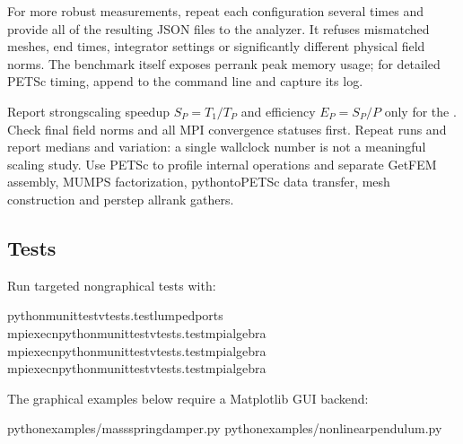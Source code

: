 \documentclass[letterpaper,10pt,english]{sphinxmanual}
\begin{document}
\sphinxAtStartPar
For more robust measurements, repeat each configuration several
times and provide all of the resulting JSON files to the analyzer.
It refuses mismatched meshes, end times, integrator settings or
significantly different physical field norms. The benchmark itself
exposes per\sphinxhyphen{}rank peak memory usage; for detailed PETSc timing,
append  to the command line and capture its log.

\sphinxAtStartPar
Report strong\sphinxhyphen{}scaling speedup
\(S_P=T_1/T_P\) and efficiency \(E_P=S_P/P\)
only for the . Check final field norms and
all MPI convergence statuses first. Repeat runs and report
medians and variation: a single wall\sphinxhyphen{}clock number is not
a meaningful scaling study. Use PETSc  to
profile internal operations and separate GetFEM assembly,
MUMPS factorization, python\sphinxhyphen{}to\sphinxhyphen{}PETSc data transfer,
mesh construction and per\sphinxhyphen{}step all\sphinxhyphen{}rank gathers.


\subsection{Tests}
\label{\detokenize{install:tests}}
\sphinxAtStartPar
Run targeted non\sphinxhyphen{}graphical tests with:

\begin{sphinxVerbatim}[commandchars=\\\{\}]
python\PYGZhy{}munittest\PYGZhy{}vtests.test\PYGZus{}lumped\PYGZus{}ports
mpiexec\PYGZhy{}npython\PYGZhy{}munittest\PYGZhy{}vtests.test\PYGZus{}mpi\PYGZus{}algebra
mpiexec\PYGZhy{}npython\PYGZhy{}munittest\PYGZhy{}vtests.test\PYGZus{}mpi\PYGZus{}algebra
mpiexec\PYGZhy{}npython\PYGZhy{}munittest\PYGZhy{}vtests.test\PYGZus{}mpi\PYGZus{}algebra
\end{sphinxVerbatim}

\sphinxAtStartPar
The graphical examples below require a Matplotlib GUI backend:

\begin{sphinxVerbatim}[commandchars=\\\{\}]
pythonexamples/mass\PYGZus{}spring\PYGZus{}damper.py
pythonexamples/nonlinear\PYGZus{}pendulum.py
\end{sphinxVerbatim}
\end{document}
